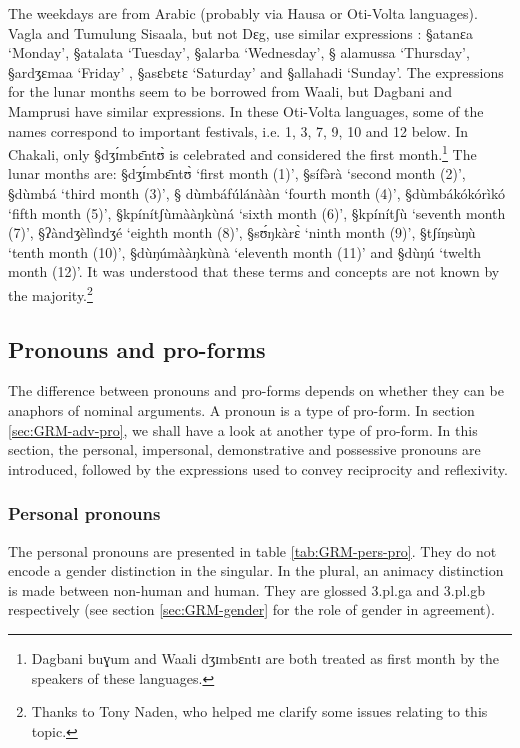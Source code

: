 The weekdays are from Arabic (probably via Hausa or Oti-Volta languages).
Vagla and
Tumulung Sisaala, but  not Dɛg, use similar expressions \citep[60]{Nade96}: 
{\S atanɛa} `Monday', {\S atalata} `Tuesday', {\S alarba} `Wednesday',   {\S
alamussa} `Thursday',  {\S ardʒɛmaa} `Friday' , {\S asɛbɛtɛ} `Saturday'    and
{\S allahadi} `Sunday'.  The expressions for the lunar months seem to be
borrowed from Waali, but Dagbani and Mamprusi have similar expressions. In
these
Oti-Volta languages, some of the names  correspond to important festivals, i.e.
1, 3, 7, 9, 10 and 12 below. In Chakali, only {\S dʒɪ́mbɛ̄ntʊ̀} is celebrated
and  considered the first month.\footnote{Dagbani {\F buɣum} and Waali {\F
dʒɪmbɛntɪ} are both treated as first month by the speakers of these
languages.} The lunar months are: {\S dʒɪ́mbɛ̄ntʊ̀} `first month
(1)', {\S sífə̀rà}  `second month (2)', {\S dùmbá} `third month (3)', {\S
dùmbáfúlánààn} `fourth month (4)',  {\S dùmbákókórìkó} `fifth month
(5)', {\S kpínítʃùmààŋkùná} `sixth month (6)', {\S kpínítʃù} `seventh
month (7)', {\S ʔàndʒèlìndʒé} `eighth month (8)', {\S sʊ́ŋkàrɛ̀} `ninth
month (9)', {\S tʃíŋsùŋù} `tenth month (10)', {\S dùŋúmààŋkùnà}
`eleventh month (11)' and {\S dùŋú} `twelth month (12)'.  It was understood
that
these terms and concepts are not known by the majority.\footnote{Thanks to Tony
Naden, who helped me clarify some issues relating to this topic.} 

\subsection{Pronouns and pro-forms}
\label{sec:GRM-pronouns}

The difference between pronouns and pro-forms depends on whether they can be 
anaphors of nominal arguments.  A pronoun is a type of pro-form. In
section \ref{sec:GRM-adv-pro}, we shall have a look at another type of
pro-form. In this section, the personal, impersonal,
demonstrative and possessive pronouns are introduced, followed by the
expressions used to convey reciprocity and reflexivity. 


\subsubsection{Personal pronouns}
\label{sec:GRM-personal-pronouns}

The  personal pronouns are presented in table
\ref{tab:GRM-pers-pro}. They 
  do not encode a gender distinction in the singular. In the
plural, an animacy  distinction is made between non-human and  human. They are
glossed {\sc 3.pl.g}a and {\sc  3.pl.g}b  respectively (see section
\ref{sec:GRM-gender} for the role of gender in agreement).  


